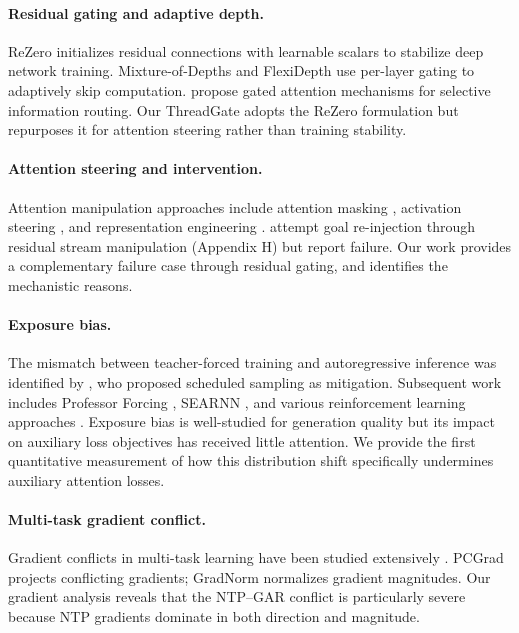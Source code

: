 \documentclass[11pt]{article}
\begin{document}
\paragraph{Residual gating and adaptive depth.}
ReZero \cite{bachlechner2021rezero} initializes residual connections with learnable scalars to stabilize deep network training.
Mixture-of-Depths \cite{raposo2024mixture} and FlexiDepth \cite{luo2025flexidepth} use per-layer gating to adaptively skip computation.
\citet{qiu2025gated} propose gated attention mechanisms for selective information routing.
Our ThreadGate adopts the ReZero formulation but repurposes it for attention steering rather than training stability.

\paragraph{Attention steering and intervention.}
Attention manipulation approaches include attention masking \cite{zhang2024tell}, activation steering \cite{li2024inference,turner2024activation}, and representation engineering \cite{zou2023representation}.
\citet{dongre2026multi} attempt goal re-injection through residual stream manipulation (Appendix H) but report failure.
Our work provides a complementary failure case through residual gating, and identifies the mechanistic reasons.

\paragraph{Exposure bias.}
The mismatch between teacher-forced training and autoregressive inference was identified by \citet{bengio2015scheduled}, who proposed scheduled sampling as mitigation.
Subsequent work includes Professor Forcing \cite{lamb2016professor}, SEARNN \cite{leblond2018searnn}, and various reinforcement learning approaches \cite{ranzato2016sequence}.
Exposure bias is well-studied for generation quality but its impact on auxiliary loss objectives has received little attention.
We provide the first quantitative measurement of how this distribution shift specifically undermines auxiliary attention losses.

\paragraph{Multi-task gradient conflict.}
Gradient conflicts in multi-task learning have been studied extensively \cite{yu2020gradient,liu2021conflict,chen2020just}.
PCGrad \cite{yu2020gradient} projects conflicting gradients; GradNorm \cite{chen2018gradnorm} normalizes gradient magnitudes.
Our gradient analysis reveals that the NTP--GAR conflict is particularly severe because NTP gradients dominate in both direction and magnitude.
\end{document}
